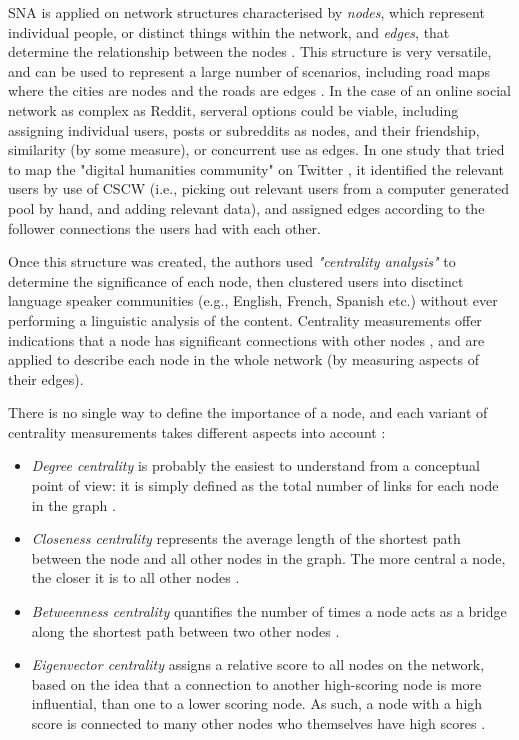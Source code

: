 \documentclass[bsc,frontabs,twoside,singlespacing,parskip,deptreport]{infthesis}
\begin{document}
SNA is applied on network structures characterised by \textit{nodes}, which represent individual people, or distinct things within the network, and \textit{edges}, that determine the relationship between the nodes \cite{OtteEvelien2002Snaa}. This structure is very versatile, and can be used to represent a large number of scenarios, including road maps where the cities are nodes and the roads are edges \cite{masters}. In the case of an online social network as complex as Reddit, serveral options could be viable, including assigning individual users, posts or subreddits as nodes, and their friendship, similarity (by some measure), or concurrent use as edges. In one study that tried to map the "digital humanities community" on Twitter \cite{GrandjeanMartin2016Asna}, it identified the relevant users by use of CSCW (i.e., picking out relevant users from a computer generated pool by hand, and adding relevant data), and assigned edges according to the follower connections the users had with each other. 

Once this structure was created, the authors used \textit{"centrality analysis"} to determine the significance of each node, then clustered users into disctinct language speaker communities (e.g., English, French, Spanish etc.) without ever performing a linguistic analysis of the content. Centrality measurements offer indications that a node has significant connections with other nodes \cite{deLaat2007} \cite{liu2011web}, and are applied to describe each node in the whole network (by measuring aspects of their edges).

There is no single way to define the importance of a node, and each variant of centrality measurements takes different aspects into account \cite{WassermanStanley1994Sna:}:

\begin{itemize}
  \item \textit{Degree centrality} is probably the easiest to understand from a conceptual point of view: it is simply defined as the total number of links  for each node in the graph \cite{erdos}. 
  \item \textit{Closeness centrality} represents the average length of the shortest path between the node and all other nodes in the graph. The more central a node, the closer it is to all other nodes \cite{BavelasAlex1950CPiT}.
  \item \textit{Betweenness centrality} quantifies the number of times a node acts as a bridge along the shortest path between two other nodes \cite{freeman}.
  \item \textit{Eigenvector centrality} assigns a relative score to all nodes on the network, based on the idea that a connection to another high-scoring node is more influential, than one to a lower scoring node. As such, a node with a high score is connected to many other nodes who themselves have high scores \cite{LangvilleAmyN2006Gpab}.
\end{itemize}
\end{document}
